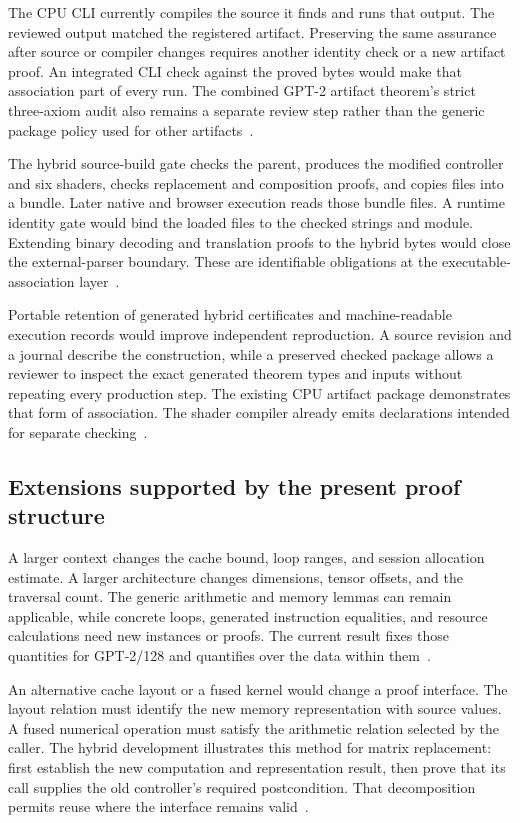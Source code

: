 The CPU CLI currently compiles the source it finds and runs that output.  The reviewed output matched the registered artifact.  Preserving the same assurance after source or compiler changes requires another identity check or a new artifact proof.  An integrated CLI check against the proved bytes would make that association part of every run.  The combined GPT-2 artifact theorem's strict three-axiom audit also remains a separate review step rather than the generic package policy used for other artifacts~\cite{driver,artifactgate,review}.

The hybrid source-build gate checks the parent, produces the modified controller and six shaders, checks replacement and composition proofs, and copies files into a bundle.  Later native and browser execution reads those bundle files.  A runtime identity gate would bind the loaded files to the checked strings and module.  Extending binary decoding and translation proofs to the hybrid bytes would close the external-parser boundary.  These are identifiable obligations at the executable-association layer~\cite{wg-build,wg-host}.

Portable retention of generated hybrid certificates and machine-readable execution records would improve independent reproduction.  A source revision and a journal describe the construction, while a preserved checked package allows a reviewer to inspect the exact generated theorem types and inputs without repeating every production step.  The existing CPU artifact package demonstrates that form of association.  The shader compiler already emits declarations intended for separate checking~\cite{artifact,wg-compiler,wg-review}.

\subsection{Extensions supported by the present proof structure}

A larger context changes the cache bound, loop ranges, and session allocation estimate.  A larger architecture changes dimensions, tensor offsets, and the traversal count.  The generic arithmetic and memory lemmas can remain applicable, while concrete loops, generated instruction equalities, and resource calculations need new instances or proofs.  The current result fixes those quantities for GPT-2/128 and quantifies over the data within them~\cite{session,budget}.

An alternative cache layout or a fused kernel would change a proof interface.  The layout relation must identify the new memory representation with source values.  A fused numerical operation must satisfy the arithmetic relation selected by the caller.  The hybrid development illustrates this method for matrix replacement: first establish the new computation and representation result, then prove that its call supplies the old controller's required postcondition.  That decomposition permits reuse where the interface remains valid~\cite{wg-packedsource,wg-backend,wg-transport}.

